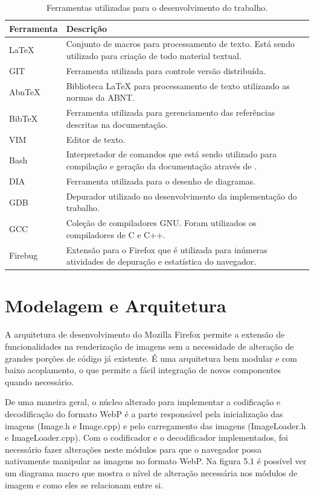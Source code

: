 \documentclass[espaco=simples,appendix=Name]{abnt}
\begin{document}
\begin{table}[ht]
	\centering
	\caption{Ferramentas utilizadas para o desenvolvimento do trabalho.
	\label{tbl:padc}}{
		\vspace{0.3cm}
		\begin{tabular}{|l|p{14cm}|}
	    	\hline
			\textbf{Ferramenta} & \textbf{Descrição} \\
			\hline
			LaTeX		& Conjunto de macros para processamento de texto. Está sendo utilizado para criação de todo material textual. \\
			\hline
			GIT		& Ferramenta utilizada para controle versão distribuída. \\
			\hline
			AbnTeX		& Biblioteca LaTeX para processamento de texto utilizando as normas da ABNT. \\
			\hline
			BibTeX		& Ferramenta utilizada para gerenciamento das referências descritas na documentação. \\
			\hline
			VIM		& Editor de texto. \\
			\hline
			Bash		& Interpretador de comandos que está sendo utilizado para compilação e geração da documentação através de \ingles{scripts}. \\
			\hline
			DIA		& Ferramenta utilizada para o desenho de diagramas. \\
			\hline
			GDB		& Depurador utilizado no desenvolvimento da implementação do trabalho. \\
			\hline
			GCC		& Coleção de compiladores GNU. Foram utilizados os compiladores de C e C++. \\
			\hline
			Firebug		& Extensão para o Firefox que é utilizada para inúmeras atividades de depuração e estatística do navegador. \\
			\hline
		\end{tabular}
		}
\end{table}

\section{Modelagem e Arquitetura}

A arquitetura de desenvolvimento do Mozilla Firefox permite a extensão de funcionalidades na renderização de imagens sem a necessidade de alteração de grandes porções de código já existente. É uma arquitetura bem modular e com baixo acoplamento, o que permite a fácil integração de novos componentes quando necessário. 

De uma maneira geral, o núcleo alterado para implementar a codificação e decodificação do formato WebP é a parte responsável pela inicialização das imagens (Image.h e Image.cpp) e pelo carregamento das imagens (ImageLoader.h e ImageLoader.cpp). Com o codificador e o decodificador implementados, foi necessário fazer alterações neste módulos para que o navegador possa nativamente manipular as imagens no formato WebP. Na figura 5.1 é possível ver um diagrama macro que mostra o nível de alteração necessária nos módulos de imagem e como eles se relacionam entre si.
\end{document}
